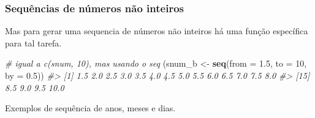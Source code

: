 \documentclass[]{book}
\newenvironment{Shaded}{\begin{snugshade}}{\end{snugshade}}
\newcommand{\KeywordTok}[1]{\textcolor[rgb]{0.13,0.29,0.53}{\textbf{#1}}}
\newcommand{\DataTypeTok}[1]{\textcolor[rgb]{0.13,0.29,0.53}{#1}}
\newcommand{\DecValTok}[1]{\textcolor[rgb]{0.00,0.00,0.81}{#1}}
\newcommand{\FloatTok}[1]{\textcolor[rgb]{0.00,0.00,0.81}{#1}}
\newcommand{\StringTok}[1]{\textcolor[rgb]{0.31,0.60,0.02}{#1}}
\newcommand{\CommentTok}[1]{\textcolor[rgb]{0.56,0.35,0.01}{\textit{#1}}}
\newcommand{\NormalTok}[1]{#1}
\begin{document}
\subsubsection{Sequências de números não
inteiros}\label{sequencias-de-numeros-nao-inteiros}

Mas para gerar uma sequencia de números não inteiros há uma função
específica para tal tarefa.

\begin{Shaded}
\begin{Highlighting}[]
\CommentTok{# igual a c(snum, 10), mas usando o seq}
\NormalTok{(snum_b <-}\StringTok{ }\KeywordTok{seq}\NormalTok{(}\DataTypeTok{from =} \FloatTok{1.5}\NormalTok{, }\DataTypeTok{to =} \DecValTok{10}\NormalTok{, }\DataTypeTok{by =} \FloatTok{0.5}\NormalTok{))}
\CommentTok{#>  [1]  1.5  2.0  2.5  3.0  3.5  4.0  4.5  5.0  5.5  6.0  6.5  7.0  7.5  8.0}
\CommentTok{#> [15]  8.5  9.0  9.5 10.0}
\end{Highlighting}
\end{Shaded}

Exemplos de sequência de anos, meses e dias.
\end{document}
